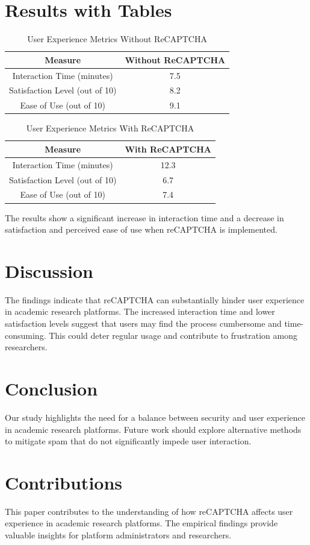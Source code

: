 \documentclass{article}
\begin{document}
\section{Results with Tables}
\begin{table}[h!]
\centering
\begin{tabular}{|c|c|}
\hline
\textbf{Measure} & \textbf{Without ReCAPTCHA} \\ \hline
Interaction Time (minutes) & 7.5 \\ \hline
Satisfaction Level (out of 10) & 8.2 \\ \hline
Ease of Use (out of 10) & 9.1 \\ \hline
\end{tabular}
\caption{User Experience Metrics Without ReCAPTCHA}
\end{table}

\begin{table}[h!]
\centering
\begin{tabular}{|c|c|}
\hline
\textbf{Measure} & \textbf{With ReCAPTCHA} \\ \hline
Interaction Time (minutes) & 12.3 \\ \hline
Satisfaction Level (out of 10) & 6.7 \\ \hline
Ease of Use (out of 10) & 7.4 \\ \hline
\end{tabular}
\caption{User Experience Metrics With ReCAPTCHA}
\end{table}

The results show a significant increase in interaction time and a decrease in satisfaction and perceived ease of use when reCAPTCHA is implemented.

\section{Discussion}
The findings indicate that reCAPTCHA can substantially hinder user experience in academic research platforms. The increased interaction time and lower satisfaction levels suggest that users may find the process cumbersome and time-consuming. This could deter regular usage and contribute to frustration among researchers.

\section{Conclusion}
Our study highlights the need for a balance between security and user experience in academic research platforms. Future work should explore alternative methods to mitigate spam that do not significantly impede user interaction.

\section{Contributions}
This paper contributes to the understanding of how reCAPTCHA affects user experience in academic research platforms. The empirical findings provide valuable insights for platform administrators and researchers.
\end{document}
